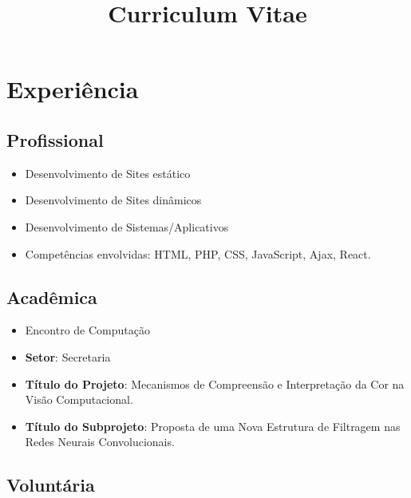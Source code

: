 \documentclass[10pt, a4paper, roman]{moderncv} %
\title{Curriculum Vitae}
\begin{document}
\makecvtitle %

\section{Experiência}

\subsection{Profissional}


\vspace{0.2cm}
{
    \begin{itemize}
        \item Desenvolvimento de Sites estático
	\item Desenvolvimento de Sites dinâmicos
	\item Desenvolvimento de Sistemas/Aplicativos
    	\item Competências envolvidas: HTML, PHP, CSS, JavaScript, Ajax, React.
    \end{itemize}
}

\vspace{0.5cm}

\subsection{Acadêmica}
 

\vspace{0.2cm}
{
	\begin{itemize}
		\item Encontro de Computação
		\item \textbf{Setor}: Secretaria
	\end{itemize}
}


\vspace{0.2cm}
{
	\begin{itemize}
		\item \textbf{Título do Projeto}: Mecanismos de Compreensão e Interpretação da Cor na Visão Computacional.
		\item \textbf{Título do Subprojeto}: Proposta de uma Nova Estrutura de Filtragem nas Redes Neurais Convolucionais.
	\end{itemize}
}


\vspace{0.5cm}
\subsection{Voluntária}
\end{document}
